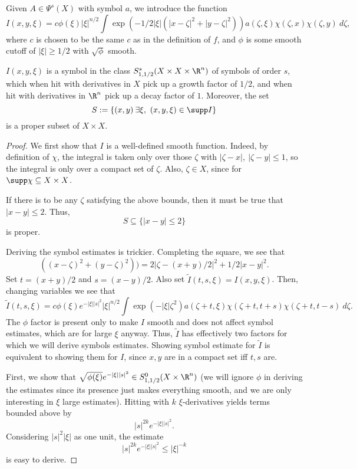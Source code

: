 \documentclass[12pt]{article}
\begin{document}
Given $A \in \Psi^s(X)$ with symbol $a$, we introduce the function
\[I(x,y,\xi) = c\phi(\xi)|\xi|^{n/2}\int \exp(-1/2|\xi|(|x-\zeta|^2+|y-\zeta|^2))a(\zeta,\xi)\chi(\zeta,x)\chi(\zeta,y)\ d\zeta,\]
where $c$ is chosen to be the same $c$ as in the definition of $f$, and $\phi$ is some smooth cutoff of $|\xi| \geq 1/2$ with $\sqrt{\phi}$ smooth.
\begin{prop}\label{i}$I(x,y,\xi)$ is a symbol in the class $S^s_{1,1/2}(X\times X\times \R^n)$ of symbols of order $s$, which when hit with derivatives in $X$ pick up a growth factor of $1/2$, and when hit with derivatives in $\R^n$ pick up a decay factor of $1$. Moreover, the set
\[S := \{(x,y)\: \exists \xi, \ (x,y,\xi) \in \supp I\}\] is a proper subset of $X\times X$.\end{prop}
\begin{proof}
We first show that $I$ is a well-defined smooth function. Indeed, by definition of $\chi$, the integral is taken only over those $\zeta$ with $|\zeta-x|, \ |\zeta-y| \leq 1$, so the integral is only over a compact set of $\zeta$. Also, $\zeta \in X$, since for $\supp \chi \subseteq X\times X$.

If there is to be any $\zeta$ satisfying the above bounds, then it must be true that $|x-y| \leq 2$. Thus, 
\[S \subseteq \{|x-y| \leq 2\}\] is proper.

Deriving the symbol estimates is trickier. Completing the square, we see that
\[((x-\zeta)^2+(y-\zeta)^2)) = 2|\zeta-(x+y)/2|^2+1/2|x-y|^2.\] Set $t = (x+y)/2$ and $s = (x-y)/2$. Also set $\tilde{I}(t,s,\xi) = I(x,y,\xi)$. Then, changing variables we see that 
\[\tilde{I}(t,s,\xi) = c\phi(\xi)e^{-|\xi||s|^2} |\xi|^{n/2}\int \exp(-|\xi|\zeta^2)a(\zeta+t,\xi)\chi(\zeta+t,t+s)\chi(\zeta+t,t-s)\ d\zeta.\]
The $\phi$ factor is present only to make $I$ smooth and does not affect symbol estimates, which are for large $\xi$ anyway. Thus, $\tilde{I}$ has effectively two factors for which we will derive symbols estimates. Showing symbol estimate for $\tilde{I}$ is equivalent to showing them for $I$, since $x,y$ are in a compact set iff $t,s$ are.

First, we show that $\sqrt{\phi(\xi)}e^{-|\xi||s|^2} \in S^0_{1,1/2}(X\times \R^n)$ (we will ignore $\phi$ in deriving the estimates since its presence just makes everything smooth, and we are only interesting in $\xi$ large estimates). Hitting with $k$ $\xi$-derivatives yields terms bounded above by
\[|s|^{2k}e^{-|\xi||s|^2}.\] Considering $|s|^2|\xi|$ as one unit, the estimate
\[|s|^{2k}e^{-|\xi||s|^2} \leq |\xi|^{-k}\] is easy to derive.


\end{proof}
\end{document}
